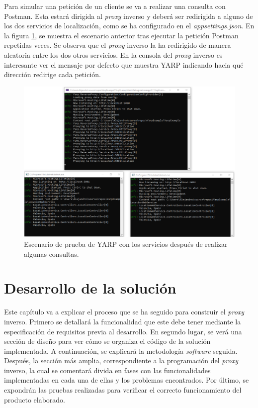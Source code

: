 \documentclass[11pt,spanish,listoffigures]{tfgetsinf}
\begin{document}
Para simular una petición de un cliente se va a realizar una consulta con Postman. Esta estará dirigida al \emph{proxy} inverso y deberá ser redirigida a alguno de los dos servicios de localización, como se ha configurado en el \emph{appsettings.json}. En la figura \ref{ejemploYARP_servicios_funcionando}, se muestra el escenario anterior tras ejecutar la petición Postman repetidas veces. Se observa que el \emph{proxy} inverso la ha redirigido de manera aleatoria entre los dos otros servicios. En la consola del \emph{proxy} inverso es interesante ver el mensaje por defecto que muestra YARP indicando hacia qué dirección redirige cada petición.

\begin{figure}[ht]
\centering
\includegraphics[width=1\textwidth]{imagenes/ejemploYARP/servicios_funcionando}
\caption{Escenario de prueba de YARP con los servicios después de realizar algunas consultas.}
	\label{ejemploYARP_servicios_funcionando}
\end{figure}


\chapter{Desarrollo de la solución}

Este capítulo va a explicar el proceso que se ha seguido para construir el \emph{proxy} inverso. Primero se detallará la funcionalidad que este debe tener mediante la especificación de requisitos previa al desarrollo. En segundo lugar, se verá una sección de diseño para ver cómo se organiza el código de la solución implementada. A continuación, se explicará la metodología \emph{software} seguida. Después, la sección más amplia, correspondiente a la programación del \emph{proxy} inverso, la cual se comentará divida en fases con las funcionalidades implementadas en cada una de ellas y los problemas encontrados. Por último, se expondrán las pruebas realizadas para verificar el correcto funcionamiento del producto elaborado.
\end{document}
